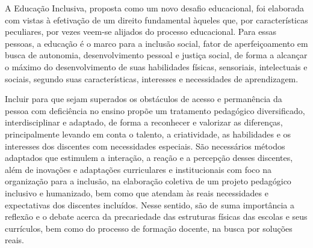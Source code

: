 \documentclass[
	12pt,				%
	openright,			%
	oneside,
	a4paper,			%
	chapter=TITLE,		%
	section=TITLE,		%
	sumario=abnt-6027-2012,
	english,			%
	brazil				%
]{abntex2}
\begin{document}
	\begin{citacao}
		A Educação Inclusiva, proposta como um novo desafio educacional, foi elaborada com vistas à efetivação de um direito fundamental àqueles que, por características peculiares, por vezes veem-se alijados do processo educacional.
		Para essas pessoas, a educação é o marco para a inclusão social, fator de aperfeiçoamento em busca de autonomia, desenvolvimento pessoal e justiça social, de forma a alcançar o máximo do desenvolvimento de suas habilidades físicas, sensoriais, intelectuais e sociais, segundo suas características, interesses e necessidades de aprendizagem.
		
		Incluir para que sejam superados os obstáculos de acesso e permanência da pessoa com deficiência no ensino propõe um tratamento pedagógico diversificado, interdisciplinar e adaptado, de forma a reconhecer e valorizar as diferenças, principalmente levando em conta o talento, a criatividade, as habilidades e os interesses dos discentes com necessidades especiais. São necessários métodos adaptados que estimulem a interação, a reação e a percepção desses discentes, além de inovações e adaptações curriculares e institucionais com foco na organização para a inclusão, na elaboração coletiva de um projeto pedagógico inclusivo e humanizado, bem como que atendam às reais necessidades e expectativas dos discentes incluídos. Nesse sentido, são de suma importância a reflexão e o debate acerca da precariedade das estruturas físicas das escolas e seus currículos, bem como do processo de formação docente, na busca por soluções reais.
	\end{citacao}





\label{___:bibliografia}








\postextual


\end{document}
